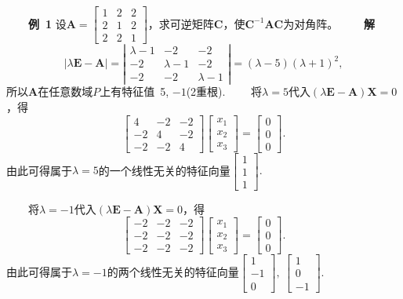 \documentclass[compress,mathserif,cjk]{beamer}
\theoremstyle{remark}
\numberwithin{equation}{section}
\newcommand{\hei}{\bf}      %
\begin{document}
\begin{CJK}{UTF8}{gbsn}
\begin{frame}\small
\ \ \ \ {\hei 例~1} 设$\bm A=\left[\begin{matrix}1&2&2\\2&1&2\\2&2&1\end{matrix}\right]$，求可逆矩阵$\bm C$，使$\bm C^{-1}\bm{AC}$为对角阵。
\pause\vskip 5pt
\ \ \ \ {\hei 解}
$$|\lambda\bm E-\bm A|=\left|\begin{matrix}\lambda-1&-2&-2\\-2&\lambda-1&-2\\-2&-2&\lambda-1\end{matrix}\right|=(\lambda-5)(\lambda+1)^2,$$
所以$\bm A$在任意数域$P$上有特征值~5, $-1$(2重根).
\pause\vskip 5pt
\ \ \ \ 将$\lambda=5$代入$(\lambda\bm E-\bm A)\bm X=0$，得
$$\left[\begin{matrix}4&-2&-2\\-2&4&-2\\-2&-2&4\end{matrix}\right]\left[\begin{matrix}x_1\\x_2\\x_3\end{matrix}\right]=\left[\begin{matrix}0\\0\\0\end{matrix}\right].$$
由此可得属于$\lambda=5$的一个线性无关的特征向量$\left[\begin{matrix}1\\1\\1\end{matrix}\right].$
\end{frame}
\begin{frame}
\ \ \ \ 将$\lambda=-1$代入$(\lambda\bm E-\bm A)\bm X=0$，得
$$\left[\begin{matrix}-2&-2&-2\\-2&-2&-2\\-2&-2&-2\end{matrix}\right]\left[\begin{matrix}x_1\\x_2\\x_3\end{matrix}\right]=\left[\begin{matrix}0\\0\\0\end{matrix}\right].$$
由此可得属于$\lambda=-1$的两个线性无关的特征向量$\left[\begin{matrix}1\\-1\\0\end{matrix}\right],~\left[\begin{matrix}1\\0\\-1\end{matrix}\right].$

\end{frame}
\end{CJK}
\end{document}
